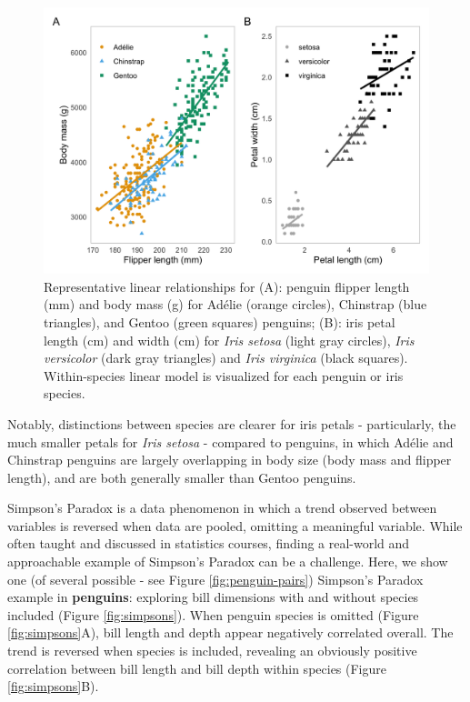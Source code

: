 \begin{Schunk}
\begin{figure}[htbp]

{\centering \includegraphics[width=\textwidth]{figs/linear-example-1} 

}

\caption[Representative linear relationships for (A)]{Representative linear relationships for (A): penguin flipper length (mm) and body mass (g) for Adélie (orange circles), Chinstrap (blue triangles), and Gentoo (green squares) penguins; (B): iris petal length (cm) and width (cm) for \textit{Iris setosa} (light gray circles), \textit{Iris versicolor} (dark gray triangles) and \textit{Iris virginica} (black squares). Within-species linear model is visualized for each penguin or iris species.}\label{fig:linear-example}
\end{figure}
\end{Schunk}

Notably, distinctions between species are clearer for iris petals -
particularly, the much smaller petals for \emph{Iris setosa} - compared
to penguins, in which Adélie and Chinstrap penguins are largely
overlapping in body size (body mass and flipper length), and are both
generally smaller than Gentoo penguins.

Simpson's Paradox is a data phenomenon in which a trend observed between
variables is reversed when data are pooled, omitting a meaningful
variable. While often taught and discussed in statistics courses,
finding a real-world and approachable example of Simpson's Paradox can
be a challenge. Here, we show one (of several possible - see Figure
\ref{fig:penguin-pairs}) Simpson's Paradox example in \textbf{penguins}:
exploring bill dimensions with and without species included (Figure
\ref{fig:simpsons}). When penguin species is omitted (Figure
\ref{fig:simpsons}A), bill length and depth appear negatively correlated
overall. The trend is reversed when species is included, revealing an
obviously positive correlation between bill length and bill depth within
species (Figure \ref{fig:simpsons}B).

